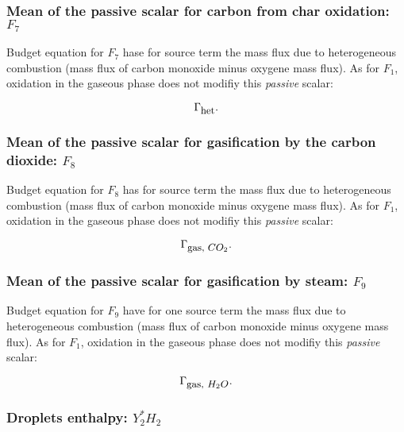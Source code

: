 \subsubsection{Mean of the passive scalar for carbon from char oxidation: $F_{7}$}

Budget equation for $F_{7}$ hase for source term the mass flux due to
heterogeneous combustion (mass flux of carbon monoxide minus oxygene mass
flux). As for $F_{1}$, oxidation in the gaseous phase does not modifiy this {\em
  passive} scalar:

\begin{equation}
   \Gamma_{\mbox{\small het}}.
\end{equation}

\subsubsection{Mean of the passive scalar for gasification by the carbon dioxide: $F_{8}$}

 Budget equation for $F_{8}$ has for source term the mass flux due to
 heterogeneous combustion (mass flux of carbon monoxide minus oxygene mass
 flux). As for $F_{1}$, oxidation in the gaseous phase does not modifiy this
 {\em passive} scalar:

\begin{equation}
   \Gamma_{\mbox{\small gas, $CO_2$}}.
\end{equation}

\subsubsection{Mean of the passive scalar for gasification by steam: $F_{9}$}

 Budget equation for $F_{9}$ have for one source term the mass flux due to
 heterogeneous combustion (mass flux of carbon monoxide minus oxygene mass
 flux). As for $F_{1}$, oxidation in the gaseous phase does not modifiy this
 {\em passive} scalar:

\begin{equation}
   \Gamma_{\mbox{\small gas, $H_{2}O$}}.
\end{equation}





\subsubsection{Droplets enthalpy: $Y_{2}^{*}H_{2}$ }


